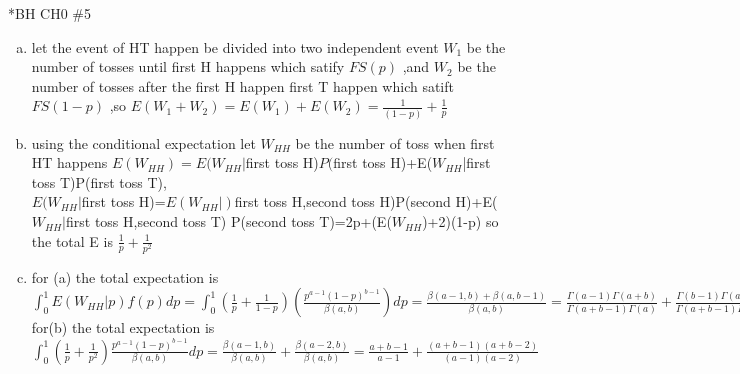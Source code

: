 \documentclass{article}
\begin{document}
\begin{homeworkProblem}*{BH CH0 \#5}
	\begin{enumerate}[(a)]
		\item let the event of HT happen be divided into two independent event $W_1$ be the number of tosses until first H happens which satify $FS(p)$ ,and $W_2$ be the number of tosses after the first H happen first T happen which satift $FS(1-p)$ ,so $E(W_1+W_2)=E(W_1)+E(W_2)=\frac{1}{(1-p)}+\frac{1}{p}$ 
		\item using the conditional expectation let $W_{HH}$ be the number of toss when first HT happens $E(W_{HH})=E(W_{HH}|$first toss H)$P($first toss H)+E($W_{HH}$|first toss T)P(first toss T),\\
		$E(W_{HH}|$first toss H)=$E(W_{HH}|)$first toss H,second toss H)P(second H)+E($W_{HH}|$first toss H,second toss T) P(second toss T)=2p+(E($W_{HH}$)+2)(1-p) so the total E is $\frac{1}{p}+\frac{1}{p^{2}}$
		\item for (a) the total expectation is $\int_{0}^{1} E(W_{HH}|p)f(p)dp=\int_{0}^{1}(\frac{1}{p}+\frac{1}{1-p})(\frac{p^{a-1}(1-p)^{b-1}}{\beta(a,b)})dp=\frac{\beta(a-1,b)+\beta(a,b-1)}{\beta(a,b)}=\frac{\Gamma(a-1)\Gamma(a+b)}{\Gamma(a+b-1)\Gamma(a)}+\frac{\Gamma(b-1)\Gamma(a+b)}{\Gamma(a+b-1)\Gamma(a)}=\frac{a+b-1}{a-1}+\frac{a+b-1}{b-1}$
 for(b) the total expectation is $\int_{0}^{1}(\frac{1}{p}+\frac{1}{p^{2}})\frac{p^{a-1}(1-p)^{b-1}}{\beta(a,b)}dp=\frac{\beta(a-1,b)}{\beta(a,b)}+\frac{\beta(a-2,b)}{\beta(a,b)}=\frac{a+b-1}{a-1}+\frac{(a+b-1)(a+b-2)}{(a-1)(a-2)}$
	\end{enumerate}
\end{homeworkProblem}
\end{document}
